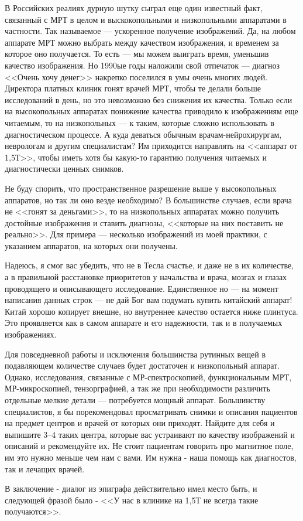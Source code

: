 В Российских реалиях дурную шутку сыграл еще один известный факт, связанный с МРТ в целом и выскокопольными и низкопольными аппаратами в частности. Так называемое --- ускоренное получение изображений. Да, на любом аппарате МРТ можно выбрать между качеством изображения, и временем за которое оно получается. То есть --- мы можем выиграть время, уменьшив качество изображения. Но 1990ые годы наложили свой отпечаток --- диагноз <<Очень хочу денег>> накрепко поселился в умы очень многих людей. Директора платных клиник гонят врачей МРТ, чтобы те делали больше исследований в день, но это невозможно без снижения их качества. Только если на высокопольных аппаратах понижение качества приводило к изображениям еще читаемым, то на низкопольных --- к таким, которые сложно использовать в диагностическом процессе. А куда деваться обычным врачам-нейрохирургам, неврологам и другим специалистам? Им приходится направлять на <<аппарат от 1,5Т>>, чтобы иметь хотя бы какую-то гарантию получения читаемых и диагностически ценных снимков. 

Не буду спорить, что пространственное разрешение выше у высокопольных аппаратов, но так ли оно везде необходимо? В большинстве случаев, если врача не <<гонят за деньгами>>, то на низкопольных аппаратах можно получить достойные изображения и ставить диагнозы, <<которые на них поставить не реально>>. Для примера --- несколько изображений из моей практики, с указанием аппаратов, на которых они получены.


Надеюсь, я смог вас убедить, что не в Тесла счастье, и даже не в их количестве, а в правильной расстановке приоритетов у начальства и врача, мозгах и глазах проводящего и описывающего исследование. Единственное но --- на момент написания данных строк --- не дай Бог вам подумать купить китайский аппарат! Китай хорошо копирует внешне, но внутреннее качество остается ниже плинтуса. Это проявляется как в самом аппарате и его надежности, так и в получаемых изображениях.

Для повседневной работы и исключения большинства рутинных вещей в подавляющем количестве случаев будет достаточен и низкопольный аппарат. Однако, исследования, связанные с МР-спектроскопией, функциональным МРТ, МР-микроскопией, тензорграфией, а так же при необходимости различить отдельные мелкие детали --- потребуется мощный аппарат. Большинству специалистов, я бы порекомендовал просматривать снимки и описания пациентов на предмет центров и врачей от которых они приходят. Найдите для себя и выпишите 3--4 таких центра, которые вас устраивают по качеству изображений и описаний и рекомендуйте их. Не стоит пациентам говорить про магнитное поле, им это нужно меньше чем нам с вами. Им нужна - наша помощь как диагностов, так и лечащих врачей.

В заключение - диалог из эпиграфа действительно имел место быть, и следующей фразой было - <<У нас в клинике на 1,5Т не всегда такие получаются>>. 